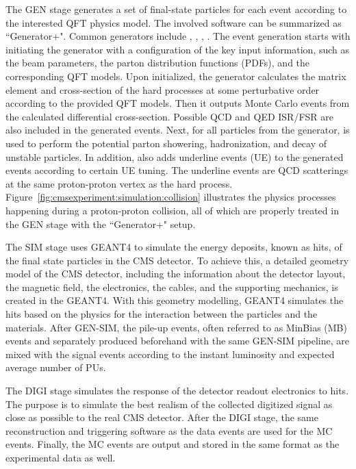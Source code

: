 The GEN stage generates a set of final-state particles for each event according to the interested QFT physics model. The involved software can be summarized as ``Generator+\PYTHIA". Common generators include \MADGRAPH, \POWHEG, \HERWIG, \SHERPA. The event generation starts with initiating the generator with a configuration of the key input information, such as the beam parameters, the parton distribution functions (PDFs), and the corresponding QFT models.  Upon initialized, the generator calculates the matrix element and cross-section of the hard processes at some perturbative order according to the provided QFT models. Then it outputs Monte Carlo events from the calculated differential cross-section. Possible QCD and QED ISR/FSR are also included in the generated events. Next, for all particles from the generator, \PYTHIA is used to perform the potential parton showering, hadronization, and decay of unstable particles. In addition, \PYTHIA also adds underline events (UE) to the generated events according to certain UE tuning. The underline events are QCD scatterings at the same proton-proton vertex as the hard process. Figure~\ref{fig:cmsexperiment:simulation:collision} illustrates the physics processes happening during a proton-proton collision, all of which are properly treated in the GEN stage with the ``Generator+\PYTHIA" setup.




The SIM stage uses GEANT4 to simulate the energy deposits, known as hits, of the final state particles in the CMS detector. To achieve this, a detailed geometry model of the CMS detector, including the information about the detector layout, the magnetic field, the electronics, the cables, and the supporting mechanics, is created in the GEANT4. With this geometry modelling, GEANT4 simulates the hits based on the physics for the interaction between the particles and the materials. After GEN-SIM, the pile-up events, often referred to as MinBias (MB) events and separately produced beforehand with the same GEN-SIM pipeline, are mixed with the signal events according to the instant luminosity and expected average number of PUs.

The DIGI stage simulates the response of the detector readout electronics to hits. The purpose is to simulate the best realism of the collected digitized signal as close as possible to the real CMS detector. After the DIGI stage, the same reconstruction and triggering software as the data events are used for the MC events. Finally, the MC events are output and stored in the same format as the experimental data as well.